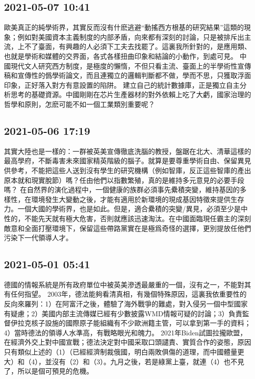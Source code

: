 \documentclass[twocolumn]{ctexart}
\begin{document}
\subsection*{2021-05-07 10:41}

歐美真正的純學術界，其實反而沒有什麽逃避“動搖西方根基的研究結果”這類的現象；例如對美國資本主義制度的内部矛盾，向來都有深刻的討論，只是被排斥出主流，上不了臺面，有興趣的人必須下工夫去找罷了。這裏我所針對的，是應用類、也就是學術和媒體的交界面，各式各樣扭曲印象和結論的小動作，到處可見。
中國現代文人研究西方制度，是極度的懶惰，不但只看主流、臺面上的半學術性宣傳稿和宣傳性的僞學術論文，而且連獨立的邏輯判斷都不做，學而不思，只獲取浮面印象，正好落入對方有意設置的陷阱。
建立自己的統計數據庫，正是獨立自主分析思考的基礎資源。中國剛剛在芯片生產器材的對外依賴上吃了大虧，國家治理的哲學和原則，怎麽可能不如一個工業類別重要呢？
\subsection*{2021-05-06 17:19}

其實大陸也是一樣的：一群被英美宣傳徹底洗腦的教授，盤踞在北大、清華這樣的最高學府，不斷毒害未來國家精英階級的腦子。就算是要尊重學術自由、保留異見供參考，不能把這些人送到沒有學生的研究機構（例如智庫，反正這些智庫的產出原本就和現實脫節）嗎？任由他們以指數繁殖，真的是維持多元意見的必要手段嗎？
在自然界的演化過程中，一個健康的族群必須事先纍積突變，維持基因的多樣性，在環境發生大變動之後，才能有適用於新環境的現成基因特徵來提供生存力。一個大國的學術界，也是如此。但是，適合纍積的突變/異見，必須至少是中性的，不能先天就有極大危害，否則就應該迅速淘汰。在中國面臨現任霸主的深刻敵意和全面打壓環境下，保留這些帶路黨實在是極爲奇怪的選擇，更別提放任他們污染下一代領導人才。
\subsection*{2021-05-01 05:41}

德國的情報系統是所有政府單位中被英美滲透最嚴重的一個，沒有之一，不能對其有任何指望。
2003年，德法能夠看清真相，有幾個特殊原因，這裏我依重要性的反向來羅列：1）在阿富汗之後，體驗了海外戰爭的難處，對入侵另一個中型國家有疑慮；2）美國内部主流傳媒已經有少數披露WMD情報可疑的討論；3）負責監督伊拉克核子設施的國際原子能組織有不少歐洲籍主管，可以拿到第一手的資料；4）當時德法的領導人水準高，有戰略眼光和魄力。
2021年Biden試圖拉攏歐盟，在經濟外交上對中國宣戰；德法決定對中國采取口頭譴責、實質合作的姿態，原因只有類似上述的（1）（已經經濟制裁俄國，明白兩敗俱傷的道理，而中國體量更大）和（4），並沒有（2）和（3）。九月之後，若是綠黨上臺，就連（4）也不見了，所以是個可預見的危機。
\end{document}
